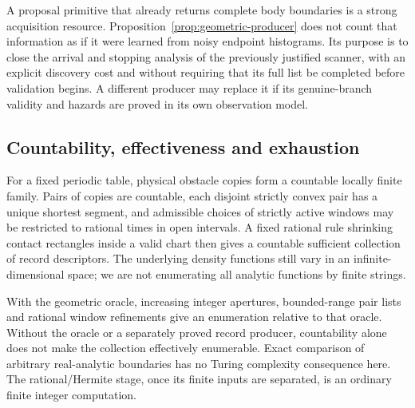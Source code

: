 A proposal primitive that already returns complete body boundaries is a
strong acquisition resource. Proposition~\ref{prop:geometric-producer}
does not count that information as if it were learned from noisy endpoint
histograms. Its purpose is to close the arrival and stopping analysis of
the previously justified scanner, with an explicit discovery cost and
without requiring that its full list be completed before validation begins.
A different producer may replace it if its genuine-branch validity and
hazards are proved in its own observation model.

\subsection{Countability, effectiveness and exhaustion}
For a fixed periodic table, physical obstacle copies form a countable
locally finite family. Pairs of copies are countable, each disjoint strictly
convex pair has a unique shortest segment, and admissible choices of strictly
active windows may be restricted to rational times in open intervals.
A fixed rational rule shrinking contact rectangles inside a valid chart
then gives a countable sufficient collection of record descriptors. The
underlying density functions still vary in an infinite-dimensional space;
we are not enumerating all analytic functions by finite strings.

With the geometric oracle, increasing integer apertures, bounded-range
pair lists and rational window refinements give an enumeration relative
to that oracle. Without the oracle or a separately proved record producer,
countability alone does not make the collection effectively enumerable.
Exact comparison of arbitrary real-analytic boundaries has no Turing
complexity consequence here. The rational/Hermite stage, once its finite
inputs are separated, is an ordinary finite integer computation.

